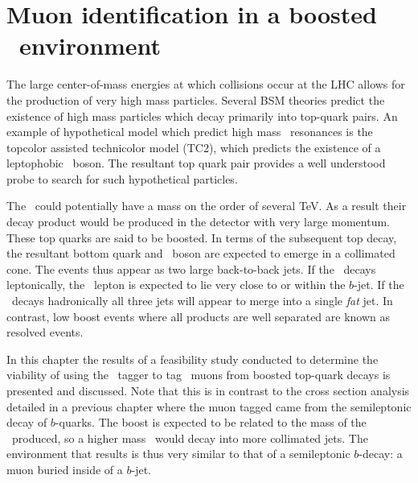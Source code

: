 \newcommand{\kT}{\ensuremath{k_{\textrm{T}}}}
\newcommand{\mzp}{\ensuremath{m_{\Zprime}}}
\newcommand{\eff}[2]{\ensuremath{\epsilon_{#1}^{#2}}}

\chapter{Muon identification in a boosted \ttbar\ environment}
\label{ch:Boosted}

The large center-of-mass energies at which collisions occur at the LHC allows for the production of very high mass particles. Several BSM theories predict the existence of high mass particles which decay primarily into top-quark pairs. An example of hypothetical model which predict high mass \ttbar\ resonances is the topcolor assisted technicolor model (TC2), which predicts the existence of a leptophobic \Zprime\ boson. The resultant top quark pair provides a well understood probe to search for such hypothetical particles. 

The \Zprime\ could potentially have a mass on the order of several \si{TeV}. As a result their decay product would be produced in the detector with very large momentum. These top quarks are said to be boosted. In terms of the subsequent top decay, the resultant bottom quark and \W\ boson are expected to emerge in a collimated cone. The events thus appear as two large back-to-back jets. If the \W\ decays leptonically, the \W\ lepton is expected to lie very close to or within the $b$-jet. If the \W\ decays hadronically all three jets will appear to merge into a single \textit{fat} jet. In contrast, low boost events where all products are well separated are known as resolved events.

In this chapter the results of a feasibility study conducted to determine the viability of using the \xsm\ tagger to tag \W\ muons from boosted top-quark decays is presented and discussed. Note that this is in contrast to the cross section analysis detailed in a previous chapter where the muon tagged came from the semileptonic decay of $b$-quarks. The boost is expected to be related to the mass of the \Zprime\ produced, so a higher mass \Zprime\ would decay into more collimated jets. The environment that results is thus very similar to that of a semileptonic $b$-decay: a muon buried inside of a $b$-jet.

